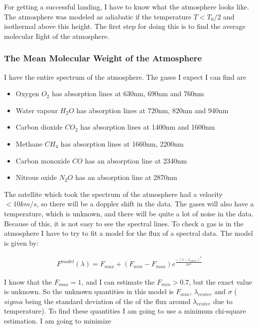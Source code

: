 \documentclass[a4paper, 10pt]{article}
\begin{document}
For getting a successful landing, I have to know what the atmosphere looks like. The atmosphere was modeled as adiabatic if the temperature $T < T_0/2$ and isothermal above this height. The first step for doing this is to find the average molecular Iight of the atmosphere.

\subsubsection{The Mean Molecular Weight of the Atmosphere}

I have the entire spectrum of the atmosphere. The gases I expect I can find are

\begin{itemize}
\item Oxygen  $O_2$ has  absorption  lines  at  630nm,
690nm and 760nm
\item Water  vapour  $H_2O$  has  absorption  lines  at
720nm,  820nm  and  940nm
\item Carbon dioxide $CO_2$ has absorption lines at
1400nm and 1600nm
\item Methane $CH_4$ has   absorption   lines   at
1660nm,  2200nm
\item Carbon monoxide $CO$ has an absorption line
at 2340nm
\item Nitrous oxide $N_2O$ has  an  absorption  line  at  2870nm
\end{itemize}

The satellite which took the spectrum of the atmosphere had a velocity $< 10 km/s$, so there will be a doppler shift in the data. The gases will also have a temperature, which is unknown, and there will be quite a lot of noise in the data. Because of this, it is not easy to see the spectral lines. To check a gas is in the atmosphere I have to try to fit a model for the flux of a spectral data. The model is given by:

\begin{align}
F^{model}(\lambda) = F_{max} +(F_{min} - F_{max})e^{\frac{-(\lambda - \lambda_{center})^2}{2\sigma^2}}
\end{align}

I know that the $F_{max} = 1$, and I can estimate the $F_{min}>0.7$, but the exact value is unknown. So the unknown quantities in this model is $F_{min}$, $\lambda_{center}$ and $\sigma$ ($sigma$ being the standard deviation of the of the flux around $\lambda_{center}$ due to temperature). To find these quantities I am going to use a minimum chi-square estimation. I am going to minimize
\end{document}
